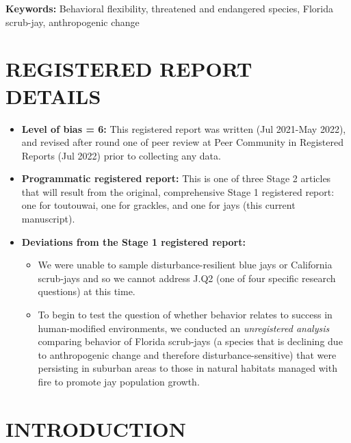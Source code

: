 \documentclass[
]{article}
\providecommand{\tightlist}{%
  \setlength{\itemsep}{0pt}\setlength{\parskip}{0pt}}
\begin{document}
\textbf{Keywords:} Behavioral flexibility, threatened and endangered
species, Florida scrub-jay, anthropogenic change

\newpage

\section{\texorpdfstring{\textbf{REGISTERED REPORT
DETAILS}}{REGISTERED REPORT DETAILS}}\label{registered-report-details}

\begin{itemize}
\tightlist
\item
  \textbf{Level of bias = 6:} This registered report was written (Jul
  2021-May 2022), and revised after round one of peer review at Peer
  Community in Registered Reports (Jul 2022) prior to collecting any
  data.
\item
  \textbf{Programmatic registered report:} This is one of three Stage 2
  articles that will result from the original, comprehensive Stage 1
  registered report: one for toutouwai, one for grackles, and one for
  jays (this current manuscript).
\item
  \textbf{Deviations from the Stage 1 registered report:}

  \begin{itemize}
  \tightlist
  \item
    We were unable to sample disturbance-resilient blue jays or
    California scrub-jays and so we cannot address J.Q2 (one of four
    specific research questions) at this time.
  \item
    To begin to test the question of whether behavior relates to success
    in human-modified environments, we conducted an \emph{unregistered
    analysis} comparing behavior of Florida scrub-jays (a species that
    is declining due to anthropogenic change and therefore
    disturbance-sensitive) that were persisting in suburban areas to
    those in natural habitats managed with fire to promote jay
    population growth.
  \end{itemize}
\end{itemize}

\section{\texorpdfstring{\textbf{INTRODUCTION}}{INTRODUCTION}}\label{introduction}
\end{document}
